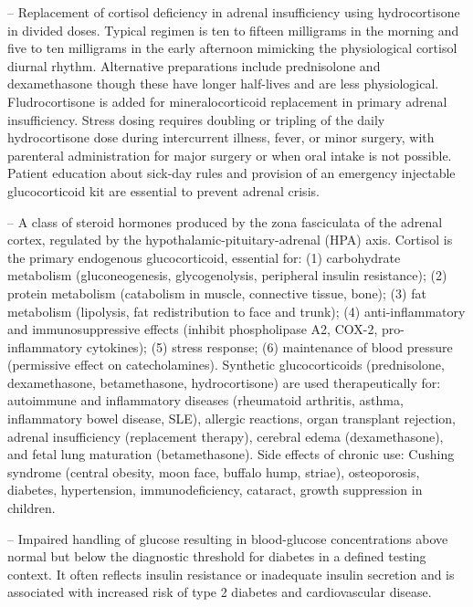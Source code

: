 -- Replacement of cortisol deficiency in adrenal insufficiency using hydrocortisone in divided doses. Typical regimen is ten to fifteen milligrams in the morning and five to ten milligrams in the early afternoon mimicking the physiological cortisol diurnal rhythm. Alternative preparations include prednisolone and dexamethasone though these have longer half-lives and are less physiological. Fludrocortisone is added for mineralocorticoid replacement in primary adrenal insufficiency. Stress dosing requires doubling or tripling of the daily hydrocortisone dose during intercurrent illness, fever, or minor surgery, with parenteral administration for major surgery or when oral intake is not possible. Patient education about sick-day rules and provision of an emergency injectable glucocorticoid kit are essential to prevent adrenal crisis.

-- A class of steroid hormones produced by the zona fasciculata of the adrenal cortex, regulated by the hypothalamic-pituitary-adrenal (HPA) axis. Cortisol is the primary endogenous glucocorticoid, essential for: (1) carbohydrate metabolism (gluconeogenesis, glycogenolysis, peripheral insulin resistance); (2) protein metabolism (catabolism in muscle, connective tissue, bone); (3) fat metabolism (lipolysis, fat redistribution to face and trunk); (4) anti-inflammatory and immunosuppressive effects (inhibit phospholipase A2, COX-2, pro-inflammatory cytokines); (5) stress response; (6) maintenance of blood pressure (permissive effect on catecholamines). Synthetic glucocorticoids (prednisolone, dexamethasone, betamethasone, hydrocortisone) are used therapeutically for: autoimmune and inflammatory diseases (rheumatoid arthritis, asthma, inflammatory bowel disease, SLE), allergic reactions, organ transplant rejection, adrenal insufficiency (replacement therapy), cerebral edema (dexamethasone), and fetal lung maturation (betamethasone). Side effects of chronic use: Cushing syndrome (central obesity, moon face, buffalo hump, striae), osteoporosis, diabetes, hypertension, immunodeficiency, cataract, growth suppression in children.

-- Impaired handling of glucose resulting in blood-glucose concentrations above normal but below the diagnostic threshold for diabetes in a defined testing context. It often reflects insulin resistance or inadequate insulin secretion and is associated with increased risk of type 2 diabetes and cardiovascular disease.


